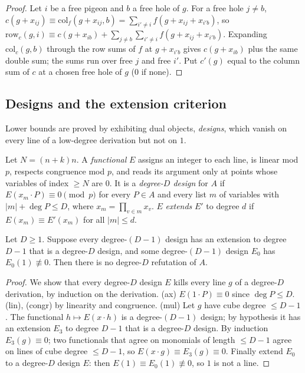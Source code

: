 \begin{proof}
Let $i$ be a free pigeon and $b$ a free hole of $g$.  For a free hole $j\ne b$,
$c(g+x_{ij})\equiv\mathrm{col}_f(g+x_{ij},b)=\sum_{i'\ne i}f(g+x_{ij}+x_{i'b})$, so
$\mathrm{row}_c(g,i)\equiv c(g+x_{ib})+\sum_{j\ne b}\sum_{i'\ne i}f(g+x_{ij}+x_{i'b})$.
Expanding $\mathrm{col}_c(g,b)$ through the row sums of $f$ at $g+x_{i'b}$ gives
$c(g+x_{ib})$ plus the same double sum; the sums run over free $j$ and free
$i'$.  Put $c'(g)$ equal to the column sum of $c$ at a chosen free hole of $g$
($0$ if none).
\end{proof}

\subsection{Designs and the extension criterion}\label{sec:defs-designs}

Lower bounds are proved by exhibiting dual objects, \emph{designs}, which vanish on every
line of a low-degree derivation but not on $1$.

\begin{definition}\label{def:design}
Let $N=(n+k)n$.  A \emph{functional} $E$ assigns an integer to each line, is
linear mod $p$, respects congruence mod $p$, and reads its argument only at
points whose variables of index $\ge N$ are $0$.  It is a \emph{degree-$D$ design}
for $A$ if $E(x_m\cdot P)\equiv0\pmod p$ for every $P\in A$ and every list $m$ of
variables with $|m|+\deg P\le D$, where $x_m=\prod_{v\in m}x_v$.  $E$
\emph{extends} $E'$ to degree $d$ if $E(x_m)\equiv E'(x_m)$ for all $|m|\le
d$.
\end{definition}

\begin{lemma}\label{lem:ext-sound}
Let $D\ge1$.  Suppose every degree-$(D-1)$ design has an extension to degree $D-1$
that is a degree-$D$ design, and some degree-$(D-1)$ design $E_0$ has
$E_0(1)\not\equiv0$.  Then there is no degree-$D$ refutation of
$A$.
\end{lemma}

\begin{proof}
We show that every degree-$D$ design $E$ kills every line $g$ of a degree-$D$
derivation, by induction on the derivation.  (ax) $E(1\cdot P)\equiv0$ since
$\deg P\le D$.  (lin), (congr) by linearity and congruence.  (mul) Let $g$ have
cube degree $\le D-1$.  The functional $h\mapsto E(x\cdot h)$ is a degree-$(D-1)$
design; by hypothesis it has an extension
$E_3$ to degree $D-1$ that is a degree-$D$ design.  By induction $E_3(g)\equiv0$;
two functionals that agree on monomials of length $\le D-1$ agree on lines of
cube degree $\le D-1$, so
$E(x\cdot g)\equiv E_3(g)\equiv0$.  Finally extend $E_0$ to a degree-$D$ design
$E$: then $E(1)\equiv E_0(1)\not\equiv0$, so $1$ is not a line.
\end{proof}

